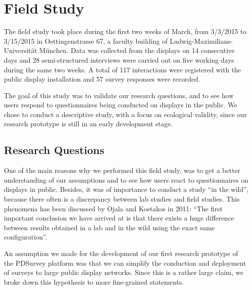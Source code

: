 \section{Field Study}
\label{sec:field-study}


	The field study took place during the first two weeks of March, from 3/3/2015 to 3/15/2015 in Oettingenstrasse 67, a faculty building of Ludwig-Maximilians-Universit\"at M\"unchen. Data was collected from the displays on 14 consecutive days and 28 semi-structured interviews were carried out on five working days during the same two weeks. A total of 117 interactions were registered with the public display installation and 57 survey responses were recorded.

	The goal of this study was to validate our research questions, and to see how users respond to questionnaires being conducted on displays in the public. We chose to conduct a descriptive study, with a focus on ecological validity, since our research prototype is still in an early development stage. 




\subsection{Research Questions}

	One of the main reasons why we performed this field study, was to get a better understanding of our assumptions and to see how users react to questionnaires on displays in public. Besides, it was of importance to conduct a study ``in the wild'', because there often is a discrepancy between lab studies and field studies. This phenomena has been discussed by Ojala and Kostakos in 2011: ``The first important conclusion we have arrived at is that there exists a huge difference between results obtained in a lab and in the wild using the exact same configuration''\cite{Ojala2011}.

	An assumption we made for the development of our first research prototype of the PDSurvey platform was that we can simplify the conduction and deployment of surveys to large public display networks. Since this is a rather large claim, we broke down this hypothesis to more fine-grained statements. 

